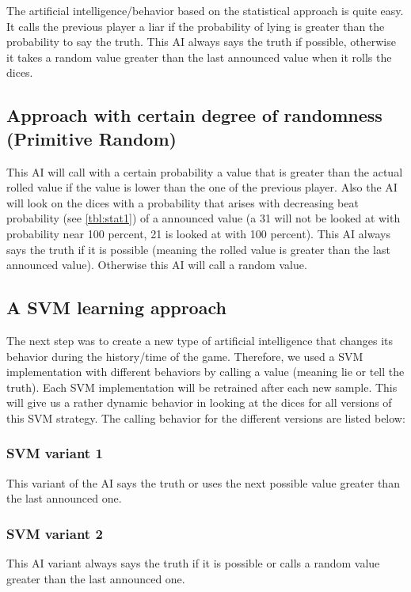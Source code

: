\documentclass[11pt]{article}
\begin{document}
The artificial intelligence/behavior based on the statistical approach is quite easy. It calls the previous player a liar if the probability of lying is greater than the probability to say the truth.
This AI always says the truth if possible, otherwise it takes a random value greater than the last announced value when it rolls the dices.


\subsection{Approach with certain degree of randomness (Primitive Random)}
\label{ssec:primitive}
This AI will call with a certain probability a value that is greater than the actual rolled value if the value is lower than the one of the previous player. Also the AI will look on the dices with a probability that arises with decreasing beat probability (see \cref{tbl:stat1}) of a announced value (a 31 will not be looked at with probability near 100 percent, 21 is looked at with 100 percent). This AI always says the truth if it is possible (meaning the rolled value is greater than the last announced value). Otherwise this AI will call a random value.

\subsection{A SVM learning approach}
The next step was to create a new type of artificial intelligence that changes its behavior during the history/time of the game.
Therefore, we used a SVM implementation with different behaviors by calling a value (meaning lie or tell the truth). Each SVM implementation will be retrained after each new sample. This will give us a rather dynamic behavior in looking at the dices for all versions of this SVM strategy. The calling behavior for the different versions are listed below:

\subsubsection{SVM variant 1}
\label{sssec:svm1}
This variant of the AI says the truth or uses the next possible value greater than the last announced one.

\subsubsection{SVM variant 2}
\label{sssec:svm2}
This AI variant always says the truth if it is possible or calls a random value greater than the last announced one. 
\end{document}
